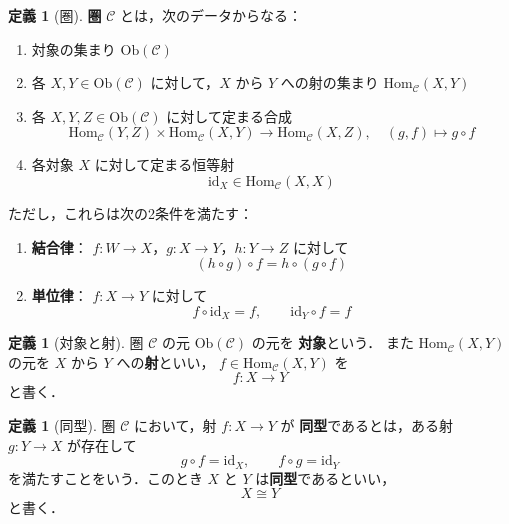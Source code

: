 \documentclass[dvipdfmx,a4paper,12pt]{jsarticle}
\theoremstyle{definition}
\newtheorem{definition}[theorem]{定義}
\begin{document}
\begin{definition}[圏]
    \textbf{圏} $\mathcal{C}$ とは，次のデータからなる：
    \begin{enumerate}
        \item 対象の集まり $\mathrm{Ob}(\mathcal{C})$
        \item 各 $X,Y\in\mathrm{Ob}(\mathcal{C})$ に対して，$X$ から $Y$ への射の集まり
        $\mathrm{Hom}_{\mathcal{C}}(X,Y)$
        \item 各 $X,Y,Z\in\mathrm{Ob}(\mathcal{C})$ に対して定まる合成
        \[
            \mathrm{Hom}_{\mathcal{C}}(Y,Z)\times
            \mathrm{Hom}_{\mathcal{C}}(X,Y)
            \to
            \mathrm{Hom}_{\mathcal{C}}(X,Z),\quad
            (g,f)\mapsto g\circ f
        \]
        \item 各対象 $X$ に対して定まる恒等射
        \[
            \mathrm{id}_X\in\mathrm{Hom}_{\mathcal{C}}(X,X)
        \]
    \end{enumerate}
    ただし，これらは次の2条件を満たす：
    \begin{enumerate}
        \item \textbf{結合律}：
        $f\colon W\to X$，$g\colon X\to Y$，$h\colon Y\to Z$ に対して
        \[
            (h\circ g)\circ f=h\circ(g\circ f)
        \]
        \item \textbf{単位律}：
        $f\colon X\to Y$ に対して
        \[
            f\circ \mathrm{id}_X=f,\qquad
            \mathrm{id}_Y\circ f=f
        \]
    \end{enumerate}
\end{definition}

\begin{definition}[対象と射]
    圏 $\mathcal{C}$ の元 $\mathrm{Ob}(\mathcal{C})$ の元を
    \textbf{対象}という．
    また $\mathrm{Hom}_{\mathcal{C}}(X,Y)$ の元を
    $X$ から $Y$ への\textbf{射}といい，
    $f\in\mathrm{Hom}_{\mathcal{C}}(X,Y)$ を
    \[
        f\colon X\to Y
    \]
    と書く．
\end{definition}

\begin{definition}[同型]
    圏 $\mathcal{C}$ において，射 $f\colon X\to Y$ が
    \textbf{同型}であるとは，ある射 $g\colon Y\to X$ が存在して
    \[
        g\circ f=\mathrm{id}_X,\qquad
        f\circ g=\mathrm{id}_Y
    \]
    を満たすことをいう．このとき $X$ と $Y$ は\textbf{同型}であるといい，
    \[
        X\cong Y
    \]
    と書く．
\end{definition}
\end{document}
